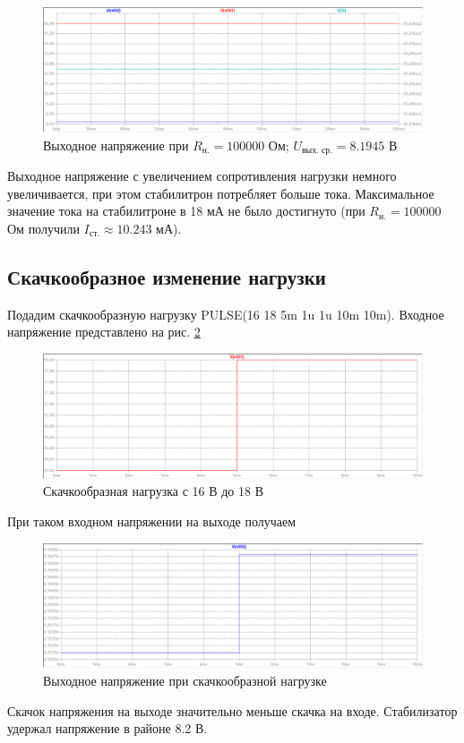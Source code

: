 \documentclass[a4paper, 12pt]{article}
\begin{document}
    \begin{figure}[H]
        \centering
        \includegraphics[scale=0.46]{1task_R100k.png}
        \captionsetup{skip=0pt}
        \caption{Выходное напряжение при $R_{\text{н.}}=100000$ Ом; $U_{\text{вых. ср.}}=8.1945$ В}
        \label{fig:1task_R100k}
    \end{figure}
    \noindent Выходное напряжение с увеличением сопротивления нагрузки немного увеличивается,
    при этом стабилитрон потребляет больше тока. Максимальное значение тока на стабилитроне в 18 мА
    не было достигнуто (при $R_{\text{н.}}=100000$ Ом получили $I_{\text{ст.}}\approx10.243$ мА).


    \subsection{Скачкообразное изменение нагрузки}
    Подадим скачкообразную нагрузку PULSE(16 18 5m 1u 1u 10m 10m). Входное напряжение
    представлено на рис. \ref{fig:1task_rect_input0}
    \begin{figure}[H]
        \centering
        \includegraphics[scale=0.46]{1task_rect_input0.png}
        \captionsetup{skip=0pt}
        \caption{Скачкообразная нагрузка с 16 В до 18 В}
        \label{fig:1task_rect_input0}
    \end{figure}
    При таком входном напряжении на выходе получаем
    \begin{figure}[H]
        \centering
        \includegraphics[scale=0.46]{1task_rect.png}
        \captionsetup{skip=0pt}
        \caption{Выходное напряжение при скачкообразной нагрузке}
        \label{fig:1task_rect}
    \end{figure}
    \noindent Скачок напряжения на выходе значительно меньше скачка на входе. Стабилизатор
    удержал напряжение в районе 8.2 В.
\end{document}
